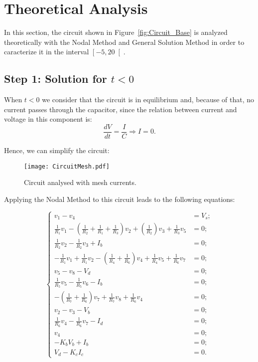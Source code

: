 \section{Theoretical Analysis}
\label{sec:analysis}

In this section, the circuit shown in Figure~\ref{fig:Circuit_Base} is analyzed theoretically with the Nodal Method and General Solution Method in order to caracterize it in the interval $\left[-5,20\right[$.

\subsection{Step 1: Solution for $t<0$}

When $t<0$ we consider that the circuit is in equilibrium and, because of that, no current passes through the capacitor, since the relation between current and voltage in this component is:
\begin{equation}
  \frac{dV}{dt}=\frac{I}{C} \Rightarrow I = 0.
  \label{eq:Cap}
\end{equation}

Hence, we can simplify the circuit:
\begin{figure}[h] \centering
\texttt{[image: CircuitMesh.pdf]}
\caption{Circuit analysed with mesh currents.}
\label{fig:Circuit_Passo1}
\end{figure}

Applying the Nodal Method to this circuit leads to the following equations:

\begin{equation}
\begin{cases}
	v_1 - v_4 &= V_s;																				  \\
	\frac{1}{R_1}v_1 - (\frac{1}{R_2}+\frac{1}{R_1}+\frac{1}{R_3})v_2 + (\frac{1}{R_2})v_3 + \frac{1}{R_3}v_5 &= 0; 																						  \\
  	\frac{1}{R_2}v_2 - \frac{1}{R_2}v_3+ I_b &= 0;													  \\
  	-\frac{1}{R_1}v_1 + \frac{1}{R_1}v_2 - (\frac{1}{R_4}+\frac{1}{R_6})v_4 + \frac{1}{R_4}v_5 + \frac{1}{R_6}v_7 &= 0;			  																	  \\
	v_5 - v_8 - V_d &= 0;																			  \\
  	\frac{1}{R_5}v_5 - \frac{1}{R_5}v_6 - I_b &= 0;												  	  \\
  	-(\frac{1}{R_7}+\frac{1}{R_6})v_7 + \frac{1}{R_7}v_8 + \frac{1}{R_6}v_4 &= 0;					  \\
	v_2 - v_3 - V_b &= 0;																			  \\
  	\frac{1}{R_6}v_4 - \frac{1}{R_6}v_7 - I_d &= 0;													  \\
  	v_4 &= 0;																						  \\
  	-K_bV_b + I_b &= 0;																				  \\
  	V_d - K_cI_c &= 0.
\end{cases}
\end{equation}


